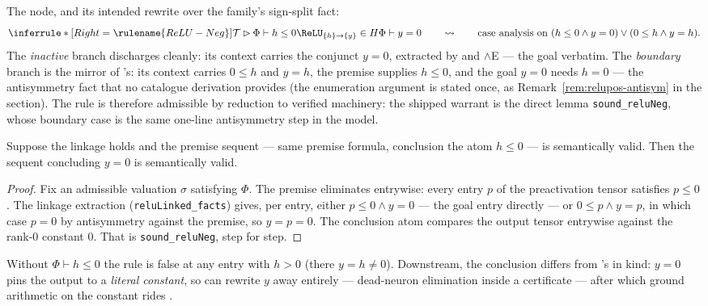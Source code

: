 

\begin{brecipe}\label{rec:reluneg-instance}
The node, and its intended rewrite over the family's sign-split fact:
\[
\inferrule*[Right=\rulename{ReLU-Neg}]{
  \mathcal{T} \rhd \Phi \vdash h \leq 0 \\
  \ReLU_{\{h\}\to\{y\}} \in H
}{
  \Phi \vdash y = 0
}
\qquad\rightsquigarrow\qquad
\text{case analysis on }
(h \leq 0 \wedge y = 0) \vee (0 \leq h \wedge y = h).
\]
The \emph{inactive} branch discharges cleanly: its context carries the
conjunct $y = 0$, extracted by  and $\wedge$E --- the goal
verbatim. The \emph{boundary} branch is the mirror of
's: its context carries $0 \leq h$ and $y = h$, the
premise supplies $h \leq 0$, and the goal $y = 0$ needs $h = 0$ --- the
antisymmetry fact that no catalogue derivation provides (the
enumeration argument is stated once, as
Remark~\ref{rem:relupos-antisym} in the  section).
The rule is therefore admissible by reduction to verified machinery:
the shipped warrant is the direct lemma \texttt{sound\_reluNeg}, whose
boundary case is the same one-line antisymmetry step in the model.
\end{brecipe}

\begin{bprop}\label{prop:reluneg-sound}
Suppose the linkage holds and the premise sequent --- same premise
formula, conclusion the atom $h \leq 0$ --- is semantically valid.
Then the sequent concluding $y = 0$ is semantically valid.
\end{bprop}
\begin{proof}
Fix an admissible valuation $\sigma$ satisfying $\Phi$. The premise
eliminates entrywise: every entry $p$ of the preactivation tensor
satisfies $p \leq 0$. The linkage extraction
(\texttt{reluLinked\_facts}) gives, per entry, either $p \leq 0 \wedge
y = 0$ --- the goal entry directly --- or $0 \leq p \wedge y = p$, in
which case $p = 0$ by antisymmetry against the premise, so $y = p =
0$. The conclusion atom compares the output tensor entrywise against
the rank-$0$ constant $0$. That is \texttt{sound\_reluNeg}, step for
step.
\end{proof}

\begin{bremark}
Without $\Phi \vdash h \leq 0$ the rule is false at any entry with
$h > 0$ (there $y = h \neq 0$). Downstream, the conclusion differs
from 's in kind: $y = 0$ pins the output to a
\emph{literal constant}, so  can rewrite $y$ away
entirely --- dead-neuron elimination inside a certificate --- after
which ground arithmetic on the constant rides
.
\end{bremark}

